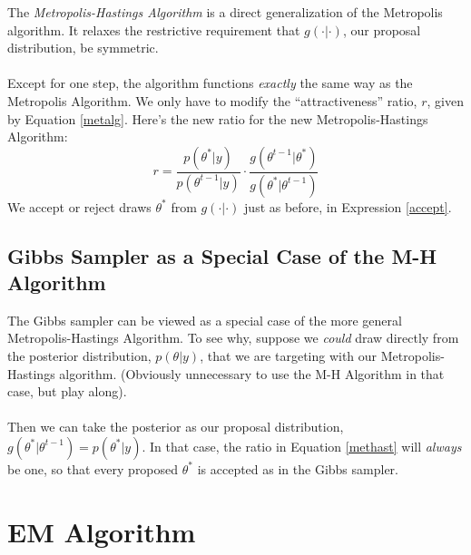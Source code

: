 \documentclass[12pt]{article}
\begin{document}
The \emph{Metropolis-Hastings Algorithm} is a direct generalization
of the Metropolis algorithm. It relaxes the restrictive 
requirement that $g(\cdot|\cdot)$, our proposal distribution, be 
symmetric.
\\
\\
Except for one step, the algorithm functions \emph{exactly} the same
way as the Metropolis Algorithm. We only have to modify the 
``attractiveness'' ratio, $r$, given by Equation \ref{metalg}. Here's
the new ratio for the new Metropolis-Hastings Algorithm:
\begin{equation}
   \label{methast}
   r = \frac{ p(\theta^* | y) }{p(\theta^{t-1} | y)} \cdot 
   \frac{ g(\theta^{t-1} | \theta^*)}{ g(\theta^* | \theta^{t-1})} 
\end{equation}
We accept or reject draws $\theta^*$ from $g(\cdot | \cdot)$
just as before, in Expression \ref{accept}.

\subsection{Gibbs Sampler as a Special Case of the M-H
   Algorithm}
The Gibbs sampler can be viewed as a special case of the more general 
Metropolis-Hastings Algorithm. To see why,
suppose we \emph{could} draw directly from the posterior distribution,
$p(\theta | y)$, that we are targeting with our Metropolis-Hastings
algorithm. (Obviously unnecessary to use the M-H Algorithm in that case,
but play along). 
\\
\\
Then we can take the posterior as our proposal distribution, 
$g(\theta^*| \theta^{t-1}) = p(\theta^*| y)$. In that case, the 
ratio in Equation \ref{methast} will \emph{always} be one, so that
every proposed $\theta^*$ is accepted as in the Gibbs sampler.

\newpage
\section{EM Algorithm}
\end{document}
